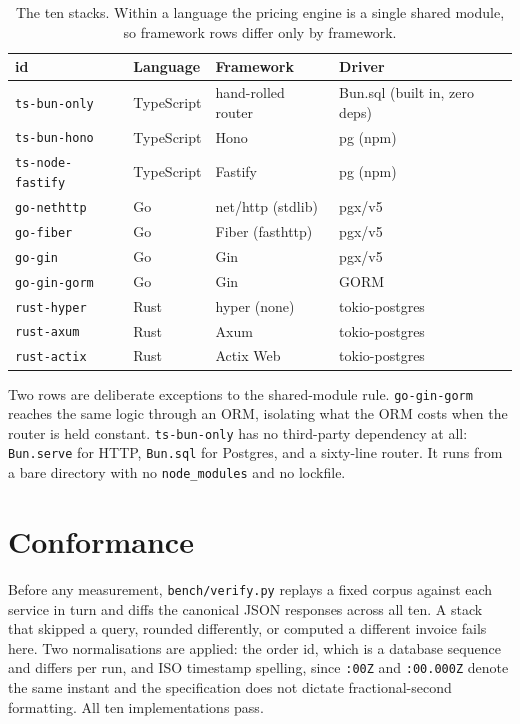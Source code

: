 \documentclass[11pt,a4paper]{article}
\begin{document}
\begin{table}[h]\centering\small
\caption{The ten stacks. Within a language the pricing engine is a single
shared module, so framework rows differ only by framework.}
\begin{tabular}{llll}
\toprule
    \textbf{id} & \textbf{Language} & \textbf{Framework} & \textbf{Driver} \\
\midrule
    \texttt{ts-bun-only} & TypeScript & hand-rolled router & Bun.sql (built in, zero deps) \\
    \texttt{ts-bun-hono} & TypeScript & Hono & pg (npm) \\
    \texttt{ts-node-fastify} & TypeScript & Fastify & pg (npm) \\
    \texttt{go-nethttp} & Go & net/http (stdlib) & pgx/v5 \\
    \texttt{go-fiber} & Go & Fiber (fasthttp) & pgx/v5 \\
    \texttt{go-gin} & Go & Gin & pgx/v5 \\
    \texttt{go-gin-gorm} & Go & Gin & GORM \\
    \texttt{rust-hyper} & Rust & hyper (none) & tokio-postgres \\
    \texttt{rust-axum} & Rust & Axum & tokio-postgres \\
    \texttt{rust-actix} & Rust & Actix Web & tokio-postgres \\
\bottomrule
\end{tabular}
\end{table}

Two rows are deliberate exceptions to the shared-module rule.
\texttt{go-gin-gorm} reaches the same logic through an ORM, isolating what the
ORM costs when the router is held constant. \texttt{ts-bun-only} has no
third-party dependency at all: \texttt{Bun.serve} for HTTP, \texttt{Bun.sql} for
Postgres, and a sixty-line router. It runs from a bare directory with no
\texttt{node\_modules} and no lockfile.

\section{Conformance}

Before any measurement, \texttt{bench/verify.py} replays a fixed corpus against
each service in turn and diffs the canonical JSON responses across all ten.
A stack that skipped a query, rounded differently, or computed a different
invoice fails here. Two normalisations are applied: the order id, which is a
database sequence and differs per run, and ISO timestamp spelling, since
\texttt{:00Z} and \texttt{:00.000Z} denote the same instant and the
specification does not dictate fractional-second formatting. All ten
implementations pass.
\end{document}
